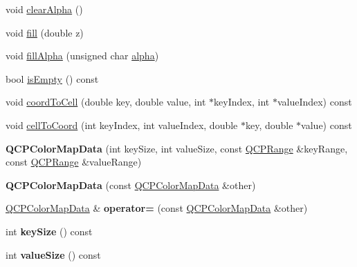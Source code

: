 \begin{DoxyCompactItemize}
void \hyperlink{class_q_c_p_color_map_data_a14d08b9c3720cd719400079b86d3906b}{clear\+Alpha} ()
\item 
void \hyperlink{class_q_c_p_color_map_data_a350f783260eb9b5de5c7b5e0d5d3e3c2}{fill} (double z)
\item 
void \hyperlink{class_q_c_p_color_map_data_a93e2a549d7702bc849cd48a585294657}{fill\+Alpha} (unsigned char \hyperlink{class_q_c_p_color_map_data_a4f7e6b7a97017400cbbd46f0660e68ea}{alpha})
\item 
bool \hyperlink{class_q_c_p_color_map_data_a986009324aee1fc5f696db46bd03dde5}{is\+Empty} () const 
\item 
void \hyperlink{class_q_c_p_color_map_data_a26e33c5ec7094b60136350bcd77d3737}{coord\+To\+Cell} (double key, double value, int $\ast$key\+Index, int $\ast$value\+Index) const 
\item 
void \hyperlink{class_q_c_p_color_map_data_ac96d6e84befe7b9951b5da6d4d4a2a47}{cell\+To\+Coord} (int key\+Index, int value\+Index, double $\ast$key, double $\ast$value) const 
\item 
{\bfseries Q\+C\+P\+Color\+Map\+Data} (int key\+Size, int value\+Size, const \hyperlink{class_q_c_p_range}{Q\+C\+P\+Range} \&key\+Range, const \hyperlink{class_q_c_p_range}{Q\+C\+P\+Range} \&value\+Range)\hypertarget{class_q_c_p_color_map_data_aac9d8eb81e18e240d89d56c01933fd23}{}\label{class_q_c_p_color_map_data_aac9d8eb81e18e240d89d56c01933fd23}

\item 
{\bfseries Q\+C\+P\+Color\+Map\+Data} (const \hyperlink{class_q_c_p_color_map_data}{Q\+C\+P\+Color\+Map\+Data} \&other)\hypertarget{class_q_c_p_color_map_data_a7f2145d86473263494abb9bf1de20436}{}\label{class_q_c_p_color_map_data_a7f2145d86473263494abb9bf1de20436}

\item 
\hyperlink{class_q_c_p_color_map_data}{Q\+C\+P\+Color\+Map\+Data} \& {\bfseries operator=} (const \hyperlink{class_q_c_p_color_map_data}{Q\+C\+P\+Color\+Map\+Data} \&other)\hypertarget{class_q_c_p_color_map_data_a115b69e1f5a0f1294e16011793c4a583}{}\label{class_q_c_p_color_map_data_a115b69e1f5a0f1294e16011793c4a583}

\item 
int {\bfseries key\+Size} () const \hypertarget{class_q_c_p_color_map_data_aa8d7811686fdfea964947715210c4af8}{}\label{class_q_c_p_color_map_data_aa8d7811686fdfea964947715210c4af8}

\item 
int {\bfseries value\+Size} () const \hypertarget{class_q_c_p_color_map_data_ab880be6bc587f34e8d22fe77ef6b57e9}{}\label{class_q_c_p_color_map_data_ab880be6bc587f34e8d22fe77ef6b57e9}


\end{DoxyCompactItemize}
